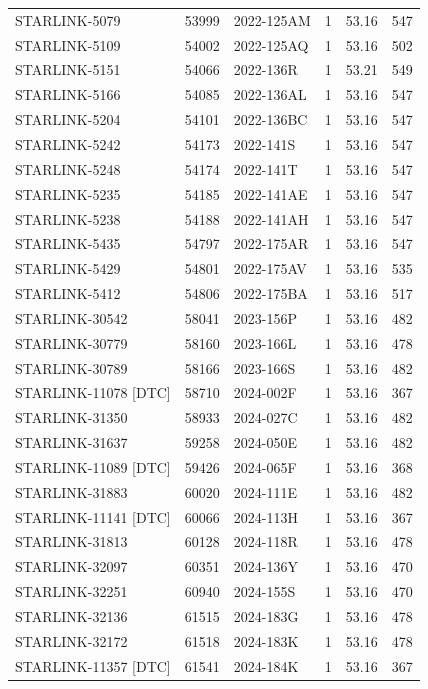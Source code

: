 \begin{longtable}{lllccc}
STARLINK-5079 & 53999 & 2022-125AM & 1 & 53.16 & 547 \\
STARLINK-5109 & 54002 & 2022-125AQ & 1 & 53.16 & 502 \\
STARLINK-5151 & 54066 & 2022-136R & 1 & 53.21 & 549 \\
STARLINK-5166 & 54085 & 2022-136AL & 1 & 53.16 & 547 \\
STARLINK-5204 & 54101 & 2022-136BC & 1 & 53.16 & 547 \\
STARLINK-5242 & 54173 & 2022-141S & 1 & 53.16 & 547 \\
STARLINK-5248 & 54174 & 2022-141T & 1 & 53.16 & 547 \\
STARLINK-5235 & 54185 & 2022-141AE & 1 & 53.16 & 547 \\
STARLINK-5238 & 54188 & 2022-141AH & 1 & 53.16 & 547 \\
STARLINK-5435 & 54797 & 2022-175AR & 1 & 53.16 & 547 \\
STARLINK-5429 & 54801 & 2022-175AV & 1 & 53.16 & 535 \\
STARLINK-5412 & 54806 & 2022-175BA & 1 & 53.16 & 517 \\
STARLINK-30542 & 58041 & 2023-156P & 1 & 53.16 & 482 \\
STARLINK-30779 & 58160 & 2023-166L & 1 & 53.16 & 478 \\
STARLINK-30789 & 58166 & 2023-166S & 1 & 53.16 & 482 \\
STARLINK-11078 [DTC] & 58710 & 2024-002F & 1 & 53.16 & 367 \\
STARLINK-31350 & 58933 & 2024-027C & 1 & 53.16 & 482 \\
STARLINK-31637 & 59258 & 2024-050E & 1 & 53.16 & 482 \\
STARLINK-11089 [DTC] & 59426 & 2024-065F & 1 & 53.16 & 368 \\
STARLINK-31883 & 60020 & 2024-111E & 1 & 53.16 & 482 \\
STARLINK-11141 [DTC] & 60066 & 2024-113H & 1 & 53.16 & 367 \\
STARLINK-31813 & 60128 & 2024-118R & 1 & 53.16 & 478 \\
STARLINK-32097 & 60351 & 2024-136Y & 1 & 53.16 & 470 \\
STARLINK-32251 & 60940 & 2024-155S & 1 & 53.16 & 470 \\
STARLINK-32136 & 61515 & 2024-183G & 1 & 53.16 & 478 \\
STARLINK-32172 & 61518 & 2024-183K & 1 & 53.16 & 478 \\
STARLINK-11357 [DTC] & 61541 & 2024-184K & 1 & 53.16 & 367 \\

\end{longtable}

